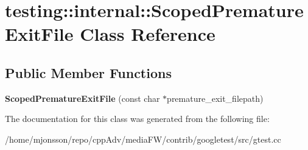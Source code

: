 \hypertarget{classtesting_1_1internal_1_1ScopedPrematureExitFile}{}\section{testing\+:\+:internal\+:\+:Scoped\+Premature\+Exit\+File Class Reference}
\label{classtesting_1_1internal_1_1ScopedPrematureExitFile}
\subsection*{Public Member Functions}
\begin{DoxyCompactItemize}
\item 
\mbox{\label{classtesting_1_1internal_1_1ScopedPrematureExitFile_ae520883b8a6984a864ce675acedff4a2}} 
{\bfseries Scoped\+Premature\+Exit\+File} (const char $\ast$premature\+\_\+exit\+\_\+filepath)
\end{DoxyCompactItemize}


The documentation for this class was generated from the following file\+:\begin{DoxyCompactItemize}
\item 
/home/mjonsson/repo/cpp\+Adv/media\+F\+W/contrib/googletest/src/gtest.\+cc\end{DoxyCompactItemize}
